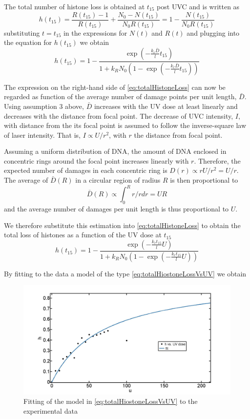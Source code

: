 \documentclass[12pt]{report}
\begin{document}
The total number of histone loss is obtained at $t_{15}$ post UVC and is written as  
\begin{equation}
h(t_{15}) = \frac{R(t_{15})-1}{R(t_{15})} +\frac{N_0-N(t_{15})}{N_0R(t_{15})}=1-\frac{N(t_{15})}{N_0R(t_{15})}
\end{equation}
substituting $t=t_{15}$ in the expressions for $N(t)$ and $R(t)$ and plugging into the equation for $h(t_{15})$ we obtain 
\begin{equation}\label{eq:totalHistoneLoss}
h(t_{15})=1-\frac{\exp(-\frac{k_r\bar{D}}{l}t_{15})}{ 1+k_RN_0(1-\exp(-\frac{k_r\bar{D}}{l}t_{15}))}
\end{equation}

The expression on the right-hand side of \ref{eq:totalHistoneLoss} can now be regarded as function of the average number of damage points per unit length, $\bar{D}$. Using assumption 3 above, $\bar{D}$ increases with the UV dose at least linearly and decreases with the distance from focal point. The decrease of UVC intensity, $I$,  with distance from the its focal point is assumed to follow the inverse-square law of laser intensity. That is, $I\propto U/r^2$, with $r$ the distance from focal point. 

Assuming a uniform distribution of DNA, the amount of DNA enclosed in concentric rings around the focal point increases linearly with $r$. Therefore, the expected number of damages in each concentric ring is $D(r)\propto rU/r^2=U/r$. 
The average of $\bar{D}(R)$ in a circular region of radius $R$ is then proportional to 
\begin{equation}
\bar{D}(R)\propto \int_0^R r/r dr = UR
\end{equation}
and the average number of damages per unit length is thus proportional to $U$.

We therefore substitute this estimation into \ref{eq:totalHistoneLoss} to obtain the total loss of histones as a function of the UV dose at $t_{15}$
\begin{equation}\label{eq:totalHiostoneLossVsUV}
h(t_{15})=1-\frac{\exp(-\frac{k_rt_{15}}{l}U)}{ 1+k_RN_0(1-\exp(-\frac{k_rt_{15}}{l}U))}
\end{equation}
 
By fitting to the data a model of the type \ref{eq:totalHiostoneLossVsUV} we obtain 
\begin{figure}[H]
\centering
\includegraphics[width=0.5\linewidth, height=0.3\textheight]{images/hVsUVDoseModelFit01}
\caption{Fitting of the model in \ref{eq:totalHiostoneLossVsUV} to the experimental data}
\label{fig:hVsUVDoseModelFit01}
\end{figure}
\end{document}
